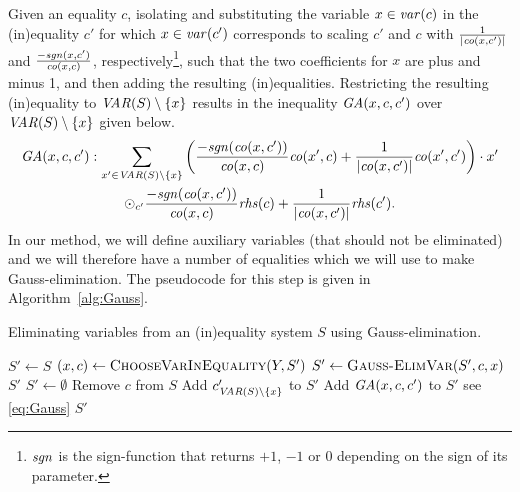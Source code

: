 Given an equality $c$, %
isolating and substituting the variable $x\in \mathit{var}(c)$ in the (in)equality $c'$ for which $x\in\mathit{var}(c')$ %
corresponds to scaling $c'$ and $c$ with $\frac{1}{|\mathit{co}(x,c')|}$ and $\frac{-\mathit{sgn}(x,c')}{\mathit{co}(x,c)}$, respectively\footnote{$\mathit{sgn}$ is the sign-function that returns $+1$, $-1$ or $0$ depending on the sign of its parameter.}, such that the two coefficients for $x$ are plus and minus 1, and then adding the resulting (in)equalities. Restricting the resulting (in)equality to $\mathit{VAR}(S)\setminus\{x\}$ results in the inequality $\mathit{GA}(x,c,c')$ over $\mathit{VAR}(S)\setminus\{x\}$ given below. %
\begin{multline}
\label{eq:Gauss}
\mathit{GA}(x,c,c'):
\sum_{x'\in\mathit{VAR}(S)\setminus\{x\}}
\left(  \frac{-\mathit{sgn}(\mathit{co}(x, c'))}{\mathit{co}(x,c)}\mathit{co}(x',c) 
+ \frac{1}{|\mathit{co}(x, c')|}\mathit{co}(x',c')\right)\cdot x' \\
\odot_{c'} \frac{-\mathit{sgn}(\mathit{co}(x, c'))}{\mathit{co}(x,c)}\mathit{rhs}(c)+ \frac{1}{|\mathit{co}(x,c')|}\mathit{rhs}(c').
\end{multline} 
%
In our method, we will define auxiliary variables (that should not be eliminated) and we will therefore have a number of equalities which we will use to make Gauss-elimination. The pseudocode for this step is given in Algorithm~\ref{alg:Gauss}.
%
\begin{algorithm}
\begin{algorithmic}\caption{Eliminating variables from an (in)equality system $S$ using Gauss-elimination.}
\label{alg:Gauss}
\State $S'\gets S$
	\State $(x, c) \gets \Call{ChooseVarInEquality}{Y,S'}$ 
	\State $S'\gets \Call{Gauss-ElimVar}{S', c, x}$
\EndWhile
\State\Return $S'$
\State
{}
	\State $S'\gets \emptyset$
	\State Remove $c$ from $S$
			\State Add $c'_{\mathit{VAR}(S)\setminus\{x\}}$ to $S'$
		\Else
			\State Add $\mathit{GA}(x,c,c')$ to $S'$ \Comment see \eqref{eq:Gauss}
		\EndIf
	\EndFor
	\State \Return $S'$ 
\EndFunction
\EndFunction
\end{algorithmic}
\end{algorithm}
